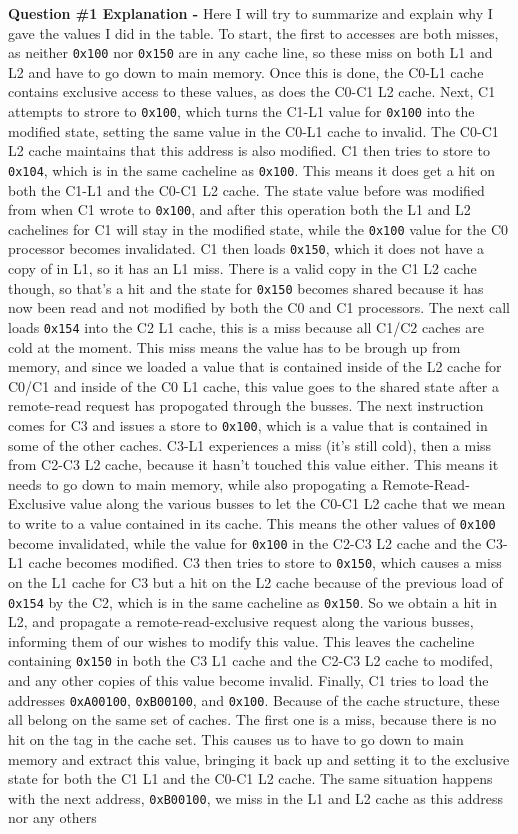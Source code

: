 \documentclass[a4paper,11pt]{article}
\newcommand{\T}{\texttt}
\begin{document}
\textbf{Question \#1 Explanation - } Here I will try to summarize and explain why I gave the values I did in the table. To start, the first to accesses are both misses, as neither \T{0x100} nor \T{0x150} are in any cache line, so these miss on both L1 and L2 and have to go down to main memory. Once this is done, the C0-L1 cache contains exclusive access to these values, as does the C0-C1 L2 cache. Next, C1 attempts to strore to \T{0x100}, which turns the C1-L1 value for \T{0x100} into the modified state, setting the same value in the C0-L1 cache to invalid. The C0-C1 L2 cache maintains that this address is also modified. C1 then tries to store to \T{0x104}, which is in the same cacheline as \T{0x100}. This means it does get a hit on both the C1-L1 and the C0-C1 L2 cache. The state value before was modified from when C1 wrote to \T{0x100}, and after this operation both the L1 and L2 cachelines for C1 will stay in the modified state, while the \T{0x100} value for the C0 processor becomes invalidated. C1 then loads \T{0x150}, which it does not have a copy of in L1, so it has an L1 miss. There is a valid copy in the C1 L2 cache though, so that's a hit and the state for \T{0x150} becomes shared because it has now been read and not modified by both the C0 and C1 processors. The next call loads \T{0x154} into the C2 L1 cache, this is a miss because all C1/C2 caches are cold at the moment. This miss means the value has to be brough up from memory, and since we loaded a value that is contained inside of the L2 cache for C0/C1 and inside of the C0 L1 cache, this value goes to the shared state after a remote-read request has propogated through the busses. The next instruction comes for C3 and issues a store to \T{0x100}, which is a value that is contained in some of the other caches. C3-L1 experiences a miss (it's still cold), then a miss from C2-C3 L2 cache, because it hasn't touched this value either. This means it needs to go down to main memory, while also propogating a Remote-Read-Exclusive value along the various busses to let the C0-C1 L2 cache that we mean to write to a value contained in its cache. This means the other values of \T{0x100} become invalidated, while the value for \T{0x100} in the C2-C3 L2 cache and the C3-L1 cache becomes modified. C3 then tries to store to \T{0x150}, which causes a miss on the L1 cache for C3 but a hit on the L2 cache because of the previous load of \T{0x154} by the C2, which is in the same cacheline as \T{0x150}. So we obtain a hit in L2, and propagate a remote-read-exclusive request along the various busses, informing them of our wishes to modify this value. This leaves the cacheline containing \T{0x150} in both the C3 L1 cache and the C2-C3 L2 cache to modifed, and any other copies of this value become invalid. Finally, C1 tries to load the addresses \T{0xA00100}, \T{0xB00100}, and \T{0x100}. Because of the cache structure, these all belong on the same set of caches. The first one is a miss, because there is no hit on the tag in the cache set. This causes us to have to go down to main memory and extract this value, bringing it back up and setting it to the exclusive state for both the C1 L1 and the C0-C1 L2 cache. The same situation happens with the next address, \T{0xB00100}, we miss in the L1 and L2 cache as this address nor any others 
\end{document}
